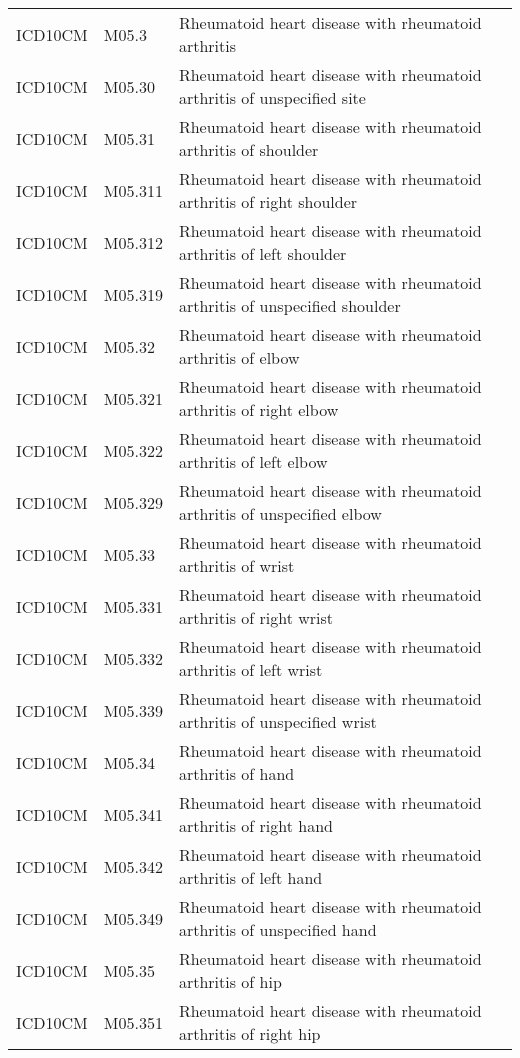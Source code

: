 \begin{longtable}{p{}p{}p{}}
  ICD10CM & M05.3 & Rheumatoid heart disease with rheumatoid arthritis \\ 
  ICD10CM & M05.30 & Rheumatoid heart disease with rheumatoid arthritis of unspecified site \\ 
  ICD10CM & M05.31 & Rheumatoid heart disease with rheumatoid arthritis of shoulder \\ 
  ICD10CM & M05.311 & Rheumatoid heart disease with rheumatoid arthritis of right shoulder \\ 
  ICD10CM & M05.312 & Rheumatoid heart disease with rheumatoid arthritis of left shoulder \\ 
  ICD10CM & M05.319 & Rheumatoid heart disease with rheumatoid arthritis of unspecified shoulder \\ 
  ICD10CM & M05.32 & Rheumatoid heart disease with rheumatoid arthritis of elbow \\ 
  ICD10CM & M05.321 & Rheumatoid heart disease with rheumatoid arthritis of right elbow \\ 
  ICD10CM & M05.322 & Rheumatoid heart disease with rheumatoid arthritis of left elbow \\ 
  ICD10CM & M05.329 & Rheumatoid heart disease with rheumatoid arthritis of unspecified elbow \\ 
  ICD10CM & M05.33 & Rheumatoid heart disease with rheumatoid arthritis of wrist \\ 
  ICD10CM & M05.331 & Rheumatoid heart disease with rheumatoid arthritis of right wrist \\ 
  ICD10CM & M05.332 & Rheumatoid heart disease with rheumatoid arthritis of left wrist \\ 
  ICD10CM & M05.339 & Rheumatoid heart disease with rheumatoid arthritis of unspecified wrist \\ 
  ICD10CM & M05.34 & Rheumatoid heart disease with rheumatoid arthritis of hand \\ 
  ICD10CM & M05.341 & Rheumatoid heart disease with rheumatoid arthritis of right hand \\ 
  ICD10CM & M05.342 & Rheumatoid heart disease with rheumatoid arthritis of left hand \\ 
  ICD10CM & M05.349 & Rheumatoid heart disease with rheumatoid arthritis of unspecified hand \\ 
  ICD10CM & M05.35 & Rheumatoid heart disease with rheumatoid arthritis of hip \\ 
  ICD10CM & M05.351 & Rheumatoid heart disease with rheumatoid arthritis of right hip \\ 

\end{longtable}
